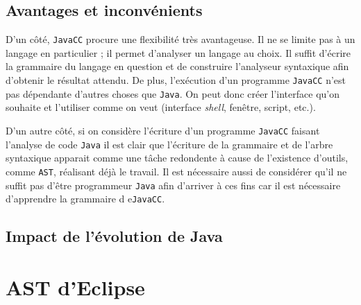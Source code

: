 \documentclass[11pt,french]{article}
\begin{document}
        \subsection{Avantages et inconvénients} %
        \label{sub:avantages-inconvenients}
            D'un côté, {\tt JavaCC} procure une flexibilité très avantageuse. Il ne se limite pas à
            un langage en particulier ; il permet d'analyser un langage au choix. Il suffit d'écrire
            la grammaire du langage en question et de construire l'analyseur syntaxique afin
            d'obtenir le résultat attendu. De plus, l'exécution d'un programme {\tt JavaCC} n'est
            pas dépendante d'autres choses que {\tt Java}. On peut donc créer l'interface qu'on
            souhaite et l'utiliser comme on veut (interface {\it shell}, fenêtre, script, etc.).

            D'un autre côté, si on considère l'écriture d'un programme {\tt JavaCC} faisant
            l'analyse de code {\tt Java} il est clair que l'écriture de la grammaire et de l'arbre
            syntaxique apparait comme une tâche redondente à cause de l'existence d'outils, comme
            {\tt AST}, réalisant déjà le travail. Il est nécessaire aussi de considérer qu'il ne
            suffit pas d'être programmeur {\tt Java} afin d'arriver à ces fins car il est nécessaire
            d'apprendre la grammaire d e{\tt JavaCC}.

        \subsection{Impact de l'évolution de Java} %
        \label{sub:impact-evolution-java}


    \section{AST d'Eclipse} %
    \label{sec:ast-eclipse}
\end{document}
